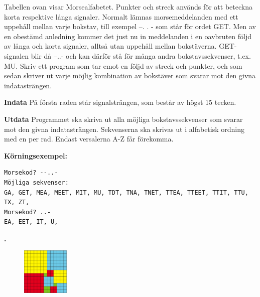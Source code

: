 \documentclass[a4paper,12pt]{article}
\newcounter{iii}\setcounter{iii}{0}
\def\i{\bigskip\noindent\refstepcounter{iii}\textbf{\arabic{iii}.} }
\newcounter{pun}[iii]
\begin{document}
Tabellen ovan visar Morsealfabetet. Punkter och streck används för att beteckna korta respektive långa signaler. Normalt lämnas morsemeddelanden med ett uppehåll mellan varje bokstav, till exempel --. . - som står för ordet GET. Men av en obestämd anledning kommer det just nu in meddelanden i en oavbruten följd av långa och korta signaler, alltså utan uppehåll mellan bokstäverna. GET-signalen blir då --..- och kan därför stå för många andra bokstavssekvenser, t.ex. MU. Skriv ett program som tar emot en följd av streck och punkter, och som sedan skriver ut varje möjlig kombination av bokstäver som svarar mot den givna indatasträngen.


\textbf{Indata}
På första raden står signalsträngen, som består av högst 15 tecken. 

\textbf{Utdata}
Programmet ska skriva ut alla möjliga bokstavssekvenser som svarar mot den givna indatasträngen. Sekvenserna ska skrivas ut i alfabetisk ordning med en per rad. Endast versalerna A-Z får förekomma.



\textbf{Körningsexempel:}
\begin{lstlisting}
Morsekod? --..- 
Möjliga sekvenser: 
GA, GET, MEA, MEET, MIT, MU, TDT, TNA, TNET, TTEA, TTEET, TTIT, TTU, TX, ZT, 
Morsekod? ..-
EA, EET, IT, U, 
\end{lstlisting}

\pagebreak

\i


\begin{figure}[!ht]
\centering
\includegraphics[width=0.2\textwidth]{kvadrater.png}
\caption{}
\label{fig:kvadrater}
\end{figure}
\end{document}
